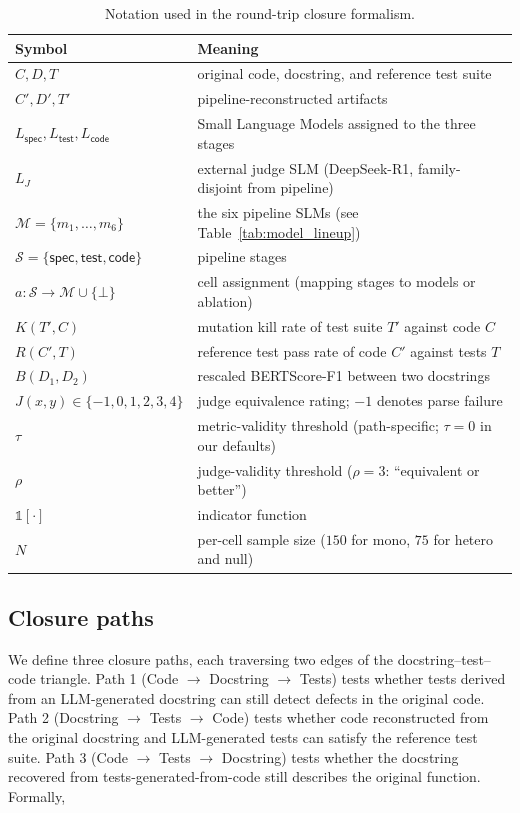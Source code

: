 \begin{table}[h]
\centering
\small
\caption{Notation used in the round-trip closure formalism.}
\label{tab:notation}
\begin{tabular}{ll}
\toprule
Symbol & Meaning \\
\midrule
$C, D, T$ & original code, docstring, and reference test suite \\
$C', D', T'$ & pipeline-reconstructed artifacts \\
$L_{\textsf{spec}}, L_{\textsf{test}}, L_{\textsf{code}}$ & Small Language Models assigned to the three stages \\
$L_J$ & external judge SLM (DeepSeek-R1, family-disjoint from pipeline) \\
$\mathcal{M} = \{m_1, \ldots, m_6\}$ & the six pipeline SLMs (see Table~\ref{tab:model_lineup}) \\
$\mathcal{S} = \{\textsf{spec}, \textsf{test}, \textsf{code}\}$ & pipeline stages \\
$a : \mathcal{S} \to \mathcal{M} \cup \{\bot\}$ & cell assignment (mapping stages to models or ablation) \\
$K(T', C)$ & mutation kill rate of test suite $T'$ against code $C$ \\
$R(C', T)$ & reference test pass rate of code $C'$ against tests $T$ \\
$B(D_1, D_2)$ & rescaled BERTScore-F1 between two docstrings \\
$J(x, y) \in \{-1, 0, 1, 2, 3, 4\}$ & judge equivalence rating; $-1$ denotes parse failure \\
$\tau$ & metric-validity threshold (path-specific; $\tau = 0$ in our defaults) \\
$\rho$ & judge-validity threshold ($\rho = 3$: ``equivalent or better'') \\
$\mathds{1}[\cdot]$ & indicator function \\
$N$ & per-cell sample size ($150$ for mono, $75$ for hetero and null) \\
\bottomrule
\end{tabular}
\end{table}

\subsection{Closure paths}

We define three closure paths, each traversing two edges of the docstring--test--code triangle. Path 1 (Code $\to$ Docstring $\to$ Tests) tests whether tests derived from an LLM-generated docstring can still detect defects in the original code. Path 2 (Docstring $\to$ Tests $\to$ Code) tests whether code reconstructed from the original docstring and LLM-generated tests can satisfy the reference test suite. Path 3 (Code $\to$ Tests $\to$ Docstring) tests whether the docstring recovered from tests-generated-from-code still describes the original function. Formally,

